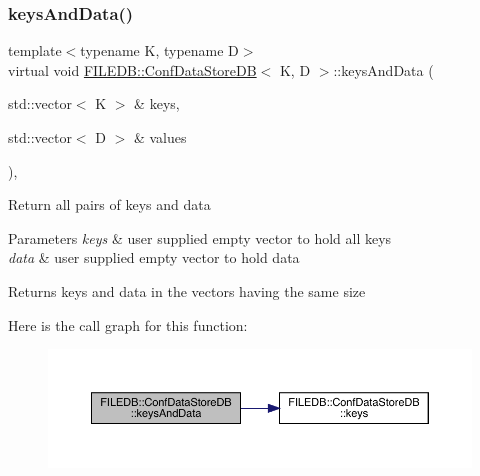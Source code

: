 \subsubsection{\texorpdfstring{keysAndData()}{keysAndData()}\hspace{0.1cm}{\footnotesize\ttfamily [2/2]}}
{\footnotesize\ttfamily template$<$typename K, typename D$>$ \\
virtual void \mbox{\hyperlink{classFILEDB_1_1ConfDataStoreDB}{F\+I\+L\+E\+D\+B\+::\+Conf\+Data\+Store\+DB}}$<$ K, D $>$\+::keys\+And\+Data (\begin{DoxyParamCaption}\item[{std\+::vector$<$ K $>$ \&}]{keys,  }\item[{std\+::vector$<$ D $>$ \&}]{values }\end{DoxyParamCaption})\hspace{0.3cm}{\ttfamily [inline]}, {\ttfamily [virtual]}}

Return all pairs of keys and data 
\begin{DoxyParams}{Parameters}
{\em keys} & user supplied empty vector to hold all keys \\
\hline
{\em data} & user supplied empty vector to hold data \\
\hline
\end{DoxyParams}
\begin{DoxyReturn}{Returns}
keys and data in the vectors having the same size 
\end{DoxyReturn}
Here is the call graph for this function\+:
\nopagebreak
\begin{figure}[H]
\begin{center}
\leavevmode
\includegraphics[width=350pt]{d8/d19/classFILEDB_1_1ConfDataStoreDB_a94333e6aab463fd336bffb28d81dd39d_cgraph}
\end{center}
\end{figure}
\mbox{\label{classFILEDB_1_1ConfDataStoreDB_ab87e2fb12067bfb19c1f381a433fd442}} 
